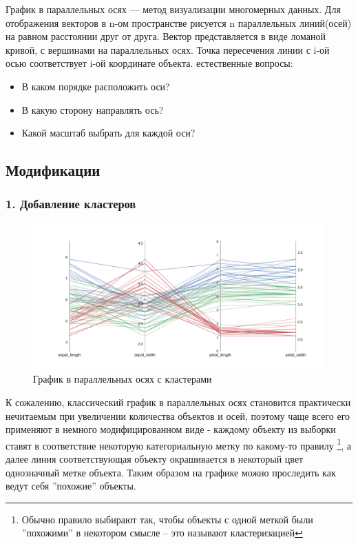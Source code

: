 \documentclass[12pt,fleqn]{article}
\begin{document}
График в параллельных осях --- метод визуализации многомерных данных.
Для отображения векторов в n-ом пространстве рисуется n параллельных линий(осей) на равном расстоянии друг 
от друга. Вектор представляется в виде ломаной кривой, с вершинами на параллельных осях. Точка пересечения
линии с i-ой осью соответствует i-ой координате объекта.
\newpage
{} естественные вопросы:
\begin{itemize}
    \item В каком порядке расположить оси?
    \item В какую сторону направлять ось?
    \item Какой масштаб выбрать для каждой оси?
\end{itemize}

\subsection{Модификации}
\subsubsection{1. Добавление кластеров}

\begin{figure}[htb]
    \centering
    \includegraphics[width=15cm]{color_pc.pdf}
    \caption{График в параллельных осях с кластерами}
    \label{color_pc}
\end{figure}

К сожалению, классический график в параллельных осях становится практически нечитаемым при увеличении 
количества объектов и осей, поэтому чаще всего его применяют в немного модифицированном виде - 
каждому объекту из выборки ставят в соответствие некоторую категориальную метку по какому-то правилу
\footnote{Обычно правило выбирают так, чтобы объекты с одной меткой были ''похожими'' в некотором смысле --
это называют кластеризацией},
а далее линия соответствующая объекту окрашивается в некоторый цвет однозначный метке объекта.
Таким образом на графике можно проследить как ведут себя ''похожие'' объекты.
\end{document}
